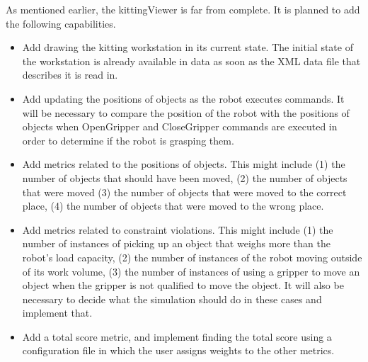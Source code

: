 As mentioned earlier, the kittingViewer is far from complete. It is
planned to add the following capabilities.

\begin{itemize}

\item Add drawing the kitting workstation in its current state. The initial
  state of the workstation is already available in data as soon as the XML
  data file that describes it is read in.

\item Add updating the positions of objects as the robot executes commands.
  It will be necessary to compare the position of the robot with the
  positions of objects when OpenGripper and CloseGripper commands are
  executed in order to determine if the robot is grasping them.

\item Add metrics related to the positions of objects. This might include
  (1) the number of objects that should have been moved, (2) the number of
  objects that were moved (3) the number of objects that were moved to the
  correct place, (4) the number of objects that were moved to the wrong
  place.

\item Add metrics related to constraint violations. This might include (1)
  the number of instances of picking up an object that weighs more than the
  robot's load capacity, (2) the number of instances of the robot moving
  outside of its work volume, (3) the number of instances of using a
  gripper to move an object when the gripper is not qualified to move the
  object. It will also be necessary to decide what the simulation should do
  in these cases and implement that.

\item Add a total score metric, and implement finding the total score using
  a configuration file in which the user assigns weights to the other
  metrics.

\end{itemize} 
